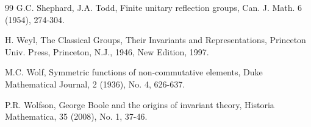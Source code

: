 \documentclass{amsart}
\theoremstyle{definition}
\begin{document}
\begin{thebibliography}{99}
G.C. Shephard, J.A. Todd,
Finite unitary reflection groups,
Can. J. Math. 6 (1954), 274-304.

H. Weyl,
The Classical Groups, Their Invariants and Representations,
Princeton Univ. Press, Princeton, N.J., 1946,
New Edition, 1997.

M.C. Wolf,
Symmetric functions of non-commutative elements,
Duke Mathematical Journal, 2 (1936), No. 4, 626-637.

P.R. Wolfson,
George Boole and the origins of invariant theory,
Historia Mathematica, 35 (2008), No. 1, 37-46.

\end{thebibliography}
\end{document}
